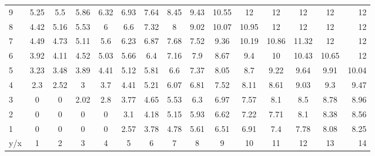 \begin{tabular}{| l || c | c | c | c | c | c | c | c | c | c | c | c | c | r |}
\hline
9	&5.25	&5.5	&5.86	&6.32	&6.93	&7.64	&8.45	&9.43	&10.55	&12	    &12	    &12	    &12	    &12\\
8	&4.42	&5.16	&5.53	&6	    &6.6	&7.32	&8	    &9.02	&10.07	&10.95	&12	    &12	    &12	    &12\\
7	&4.49	&4.73	&5.11	&5.6	&6.23	&6.87	&7.68	&7.52	&9.36	&10.19	&10.86	&11.32	&12	    &12\\
6	&3.92	&4.11	&4.52	&5.03	&5.66	&6.4	&7.16	&7.9	&8.67	&9.4	&10	    &10.43	&10.65	&12\\
5	&3.23	&3.48	&3.89	&4.41	&5.12	&5.81	&6.6	&7.37	&8.05	&8.7	&9.22	&9.64	&9.91	&10.04\\
4	&2.3	&2.52   &3	    &3.7	&4.41	&5.21	&6.07	&6.81	&7.52	&8.11	&8.61	&9.03	&9.3	&9.47\\
3	&0		&0	    &2.02	&2.8	&3.77	&4.65	&5.53	&6.3	&6.97	&7.57	&8.1	&8.5	&8.78	&8.96\\
2	&0		&0	    &0	    &0	    &3.1	&4.18	&5.15	&5.93	&6.62	&7.22	&7.71	&8.1	&8.38	&8.56\\
1	&0		&0	    &0	    &0	    &2.57	&3.78	&4.78	&5.61	&6.51	&6.91	&7.4	&7.78	&8.08	&8.25\\ \hline \hline
y/x	&1		&2	    &3	    &4	    &5		&6		&7		&8		&9		&10		&11		&12		&13		&14\\\hline
\end{tabular}